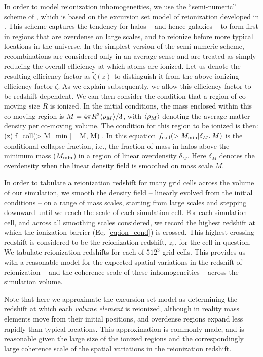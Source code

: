 In order to 
model reionization inhomogeneities, we use the ``semi-numeric'' scheme of \citet{Zahn:2006sg}, which is based on the excursion set model of reionization developed
in \citet{Furlanetto:2004nh}.
This scheme captures the tendency for halos -- and hence galaxies -- to form first in
regions that are overdense on large scales, and to reionize before more typical locations in the universe. In the simplest version of the semi-numeric
scheme, recombinations are considered only in an average sense and are treated as simply reducing the overall efficiency at which atoms are ionized. Let us denote the resulting efficiency factor as $\tilde{\zeta}(z)$ to distinguish it from the above ionizing efficiency factor $\zeta$.
As we explain subsequently, we allow this efficiency factor to be redshift dependent. We can then consider the condition that
a region of co-moving size $R$ is ionized. In the initial conditions, the mass enclosed within this co-moving region is 
$M=4 \pi R^3 \langle \rho_M \rangle/3$, with $\langle \rho_M \rangle$ denoting the average matter density per co-moving volume. The condition for this
region to be ionized is then:
\beqa
\tilde{\zeta}(z) f_{\rm coll}(> M_{\rm min} | \delta_M, M) .
\label{eq:ion_cond}
\eeqa
In this equation $f_{\rm coll}(> M_{\rm min} | \delta_M, M)$ is the conditional collapse fraction, i.e., the fraction of mass in halos
above the minimum mass ($M_{\rm min}$) in a region of linear overdensity $\delta_M$. Here $\delta_M$ denotes the overdensity when the
linear density field is smoothed on mass scale $M$. 

In order to tabulate a reionization redshift for many grid cells across the volume
of our simulation, we smooth the density field -- linearly evolved from the initial conditions -- on a range of mass scales, starting from large scales and stepping downward until
we reach the scale of each simulation cell. For each simulation cell, and across all smoothing scales considered, we record
the highest redshift at which the ionization barrier (Eq. \ref{eq:ion_cond}) is crossed. This highest crossing redshift is considered
to be the reionization redshift, $z_r$, for the cell in question. We tabulate reionization redshifts for each 
of $512^3$ grid cells. This provides us with a reasonable model for the expected spatial variations in the redshift of 
reionization -- and the coherence scale of these inhomogeneities -- across the simulation volume. 

Note that here we approximate the excursion set model as determining the redshift at which each {\em volume element} is reionized, although
in reality mass elements move from their initial positions, and overdense regions expand less rapidly than typical locations. This approximation
is commonly made, and is reasonable given the large size of the ionized regions \citep{Furlanetto:2004nh} and the correspondingly large coherence scale of
the spatial variations in the reionization redshift.

